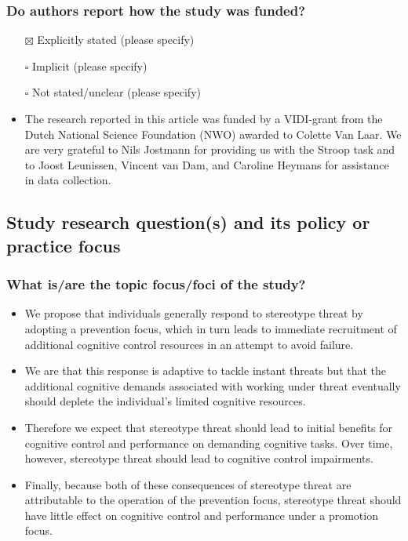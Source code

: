 \documentclass[
  doc, a4paper]{apa7}
\providecommand{\tightlist}{%
  \setlength{\itemsep}{0pt}\setlength{\parskip}{0pt}}
\begin{document}
\subsubsection{Do authors report how the study was funded?}\label{do-authors-report-how-the-study-was-funded}

\begin{itemize}
\item[$\boxtimes$]
  Explicitly stated (please specify)\\
\item[$\square$]
  Implicit (please specify)\\
\item[$\square$]
  Not stated/unclear (please specify)
\item
  The research reported in this article was funded by a VIDI-grant from the Dutch National Science Foundation (NWO) awarded to Colette Van Laar. We are very grateful to Nils Jostmann for providing us with the Stroop task and to Joost Leunissen, Vincent van Dam, and Caroline Heymans for assistance in data collection.
\end{itemize}

\subsection{Study research question(s) and its policy or practice focus}\label{study-research-questions-and-its-policy-or-practice-focus}

\subsubsection{What is/are the topic focus/foci of the study?}\label{what-isare-the-topic-focusfoci-of-the-study}

\begin{itemize}
\tightlist
\item
  We propose that individuals generally respond to stereotype threat by adopting a prevention focus, which in turn leads to immediate recruitment of additional cognitive control resources in an attempt to avoid failure.
\item
  We are that this response is adaptive to tackle instant threats but that the additional cognitive demands associated with working under threat eventually should deplete the individual's limited cognitive resources.
\item
  Therefore we expect that stereotype threat should lead to initial benefits for cognitive control and performance on demanding cognitive tasks. Over time, however, stereotype threat should lead to cognitive control impairments.
\item
  Finally, because both of these consequences of stereotype threat are attributable to the operation of the prevention focus, stereotype threat should have little effect on cognitive control and performance under a promotion focus.
\end{itemize}
\end{document}
